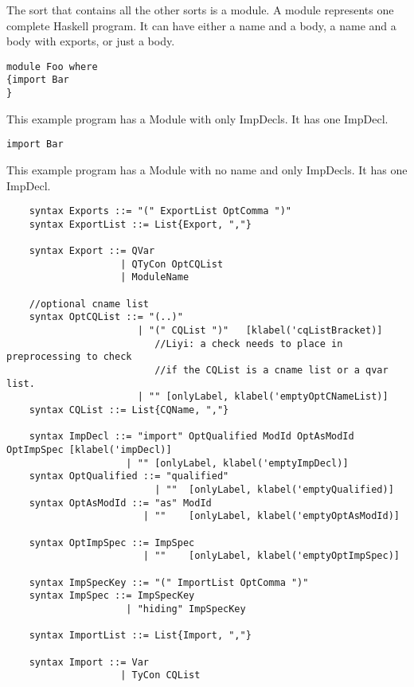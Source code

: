 The sort that contains all the other sorts is a module. A module represents one complete Haskell program. It can have either a name and a body, a name and a body with exports, or just a body.

\begin{lstlisting}
module Foo where
{import Bar
}
\end{lstlisting}

This example program has a Module with only ImpDecls. It has one ImpDecl.

\begin{lstlisting}
import Bar
\end{lstlisting}

This example program has a Module with no name and only ImpDecls. It has one ImpDecl.

\begin{lstlisting}
    syntax Exports ::= "(" ExportList OptComma ")"
    syntax ExportList ::= List{Export, ","}

    syntax Export ::= QVar 
                    | QTyCon OptCQList
                    | ModuleName

    //optional cname list
    syntax OptCQList ::= "(..)"
                       | "(" CQList ")"   [klabel('cqListBracket)]
                          //Liyi: a check needs to place in preprocessing to check
                          //if the CQList is a cname list or a qvar list.
                       | "" [onlyLabel, klabel('emptyOptCNameList)]
    syntax CQList ::= List{CQName, ","}

    syntax ImpDecl ::= "import" OptQualified ModId OptAsModId OptImpSpec [klabel('impDecl)]
                     | "" [onlyLabel, klabel('emptyImpDecl)]
    syntax OptQualified ::= "qualified"
                          | ""  [onlyLabel, klabel('emptyQualified)]
    syntax OptAsModId ::= "as" ModId
                        | ""    [onlyLabel, klabel('emptyOptAsModId)]

    syntax OptImpSpec ::= ImpSpec
                        | ""    [onlyLabel, klabel('emptyOptImpSpec)]

    syntax ImpSpecKey ::= "(" ImportList OptComma ")"
    syntax ImpSpec ::= ImpSpecKey
                     | "hiding" ImpSpecKey

    syntax ImportList ::= List{Import, ","}

    syntax Import ::= Var
                    | TyCon CQList
\end{lstlisting}

